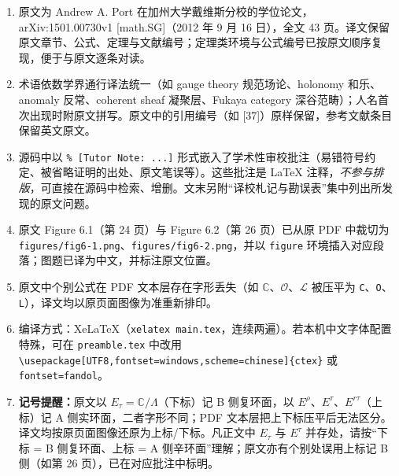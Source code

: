 \documentclass[11pt,a4paper]{article}
\theoremstyle{plain}
\theoremstyle{definition}
\begin{document}
\begin{enumerate}
  \item 原文为 Andrew A. Port 在加州大学戴维斯分校的学位论文，arXiv:1501.00730v1 [math.SG]（2012 年 9 月 16 日），全文 43 页。译文保留原文章节、公式、定理与文献编号；定理类环境与公式编号已按原文顺序复现，便于与原文逐条对读。
  \item 术语依数学界通行译法统一（如 gauge theory 规范场论、holonomy 和乐、anomaly 反常、coherent sheaf 凝聚层、Fukaya category 深谷范畴）；人名首次出现时附原文拼写。原文中的引用编号（如 [37]）原样保留，参考文献条目保留英文原文。
  \item 源码中以 \texttt{\% [Tutor Note: ...]} 形式嵌入了学术性审校批注（易错符号约定、被省略证明的出处、原文笔误等）。这些批注是 LaTeX 注释，\emph{不参与排版}，可直接在源码中检索、增删。文末另附“译校札记与勘误表”集中列出所发现的原文问题。
  \item 原文 Figure 6.1（第 24 页）与 Figure 6.2（第 26 页）已从原 PDF 中裁切为 \texttt{figures/fig6-1.png}、\texttt{figures/fig6-2.png}，并以 \texttt{figure} 环境插入对应段落；图题已译为中文，并标注原文位置。
  \item 原文中个别公式在 PDF 文本层存在字形丢失（如 $\mathbb{C}$、$\mathcal{O}$、$\mathcal{L}$ 被压平为 \texttt{C}、\texttt{O}、\texttt{L}），译文均以原页面图像为准重新排印。
  \item 编译方式：XeLaTeX（\texttt{xelatex main.tex}，连续两遍）。若本机中文字体配置特殊，可在 \texttt{preamble.tex} 中改用
        \texttt{\textbackslash usepackage[UTF8,fontset=windows,scheme=chinese]\{ctex\}} 或 \texttt{fontset=fandol}。
  \item \textbf{记号提醒：}原文以 $E_\tau=\mathbb{C}/\Lambda$（下标）记 B 侧复环面，以 $E^{\rho}$、$E^{\tau}$、$E^{r\tau}$（上标）记 A 侧实环面，二者字形不同；PDF 文本层把上下标压平后无法区分。译文均按原页面图像还原为上标/下标。凡正文中 $E_\tau$ 与 $E^\tau$ 并存处，请按“下标 = B 侧复环面、上标 = A 侧辛环面”理解；原文亦有个别处误用上标记 B 侧（如第 26 页），已在对应批注中标明。
\end{enumerate}

\tableofcontents
\newpage

﻿%
\setcounter{section}{-1}
\end{document}
